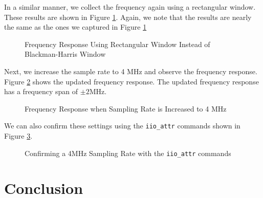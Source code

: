 \documentclass{article}
\begin{document}
In a similar manner, we collect the frequency again using a rectangular window. These results are shown in Figure \ref{fig::gnu_radio_loopback_generic_iio_rect_win}. Again, we note that the results are nearly the same as the ones we captured in Figure \ref{fig::gnu_radio_loopback_generic_iio_rect_win}

\begin{figure}[H]
	\centerline{}
	\caption{Frequency Response Using Rectangular Window Instead of Blackman-Harris Window}
	\label{fig::gnu_radio_loopback_generic_iio_rect_win}
\end{figure}

Next, we increase the sample rate to 4 MHz and observe the frequency response. Figure \ref{fig::gnu_radio_loopback_generic_iio_4MSPS} shows the updated frequency response. The updated frequency response has a frequency span of $\pm 2 \text{MHz}$.

\begin{figure}[H]
	\centerline{}
	\caption{Frequency Response when Sampling Rate is Increased to 4 MHz}
	\label{fig::gnu_radio_loopback_generic_iio_4MSPS}
\end{figure}

We can also confirm these settings using the \texttt{iio\_attr} commands shown in Figure \ref{fig::iio_attr_confirm_sampling_rate}.

\begin{figure}[H]
	\centerline{}
	\caption{Confirming a 4MHz Sampling Rate with the \texttt{iio\_attr} commands}
	\label{fig::iio_attr_confirm_sampling_rate}
\end{figure}

\section{Conclusion}

\nocite{analog_devices_libiio_error}

{}
%
	
\end{document}
